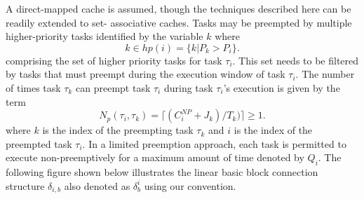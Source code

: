 A direct-mapped cache is assumed, though the techniques described here can be readily extended to set- associative caches. Tasks may be preempted by multiple higher-priority tasks identified by the variable $k$ where
\begin{equation}\label{eqn:hp-tasks}
    k \in hp(i) = \{k | P_{k} > P_{i}\}.
\end{equation}
\noindent
comprising the set of higher priority tasks for task \begin{math}\tau_{i}\end{math}.  This set needs to be filtered by tasks that must preempt during the execution window of task \begin{math}\tau_{i}\end{math}.  The number of times task \begin{math}\tau_{k}\end{math} can preempt task \begin{math}\tau_{i}\end{math} during task \begin{math}\tau_{i}\end{math}'s execution is given by the term
\begin{equation}\label{eqn:num-preemptions}
    N_{p}(\tau_{i},\tau_{k})=\lceil(C_{i}^{NP} + J_{k})/T_{k})\rceil \geq 1.
\end{equation}
\noindent
where $k$ is the index of the preempting task \begin{math}\tau_{k}\end{math} and $i$ is the index of the preempted task \begin{math}\tau_{i}\end{math}.  In a limited preemption approach, each task is permitted to execute non-preemptively for a maximum amount of time denoted by \begin{math}Q_{i}\end{math}.  The following figure shown below illustrates the linear basic block connection structure \begin{math}\delta_{i,b}\end{math} also denoted as \begin{math}\delta_{b}^{i}\end{math} using our convention.

